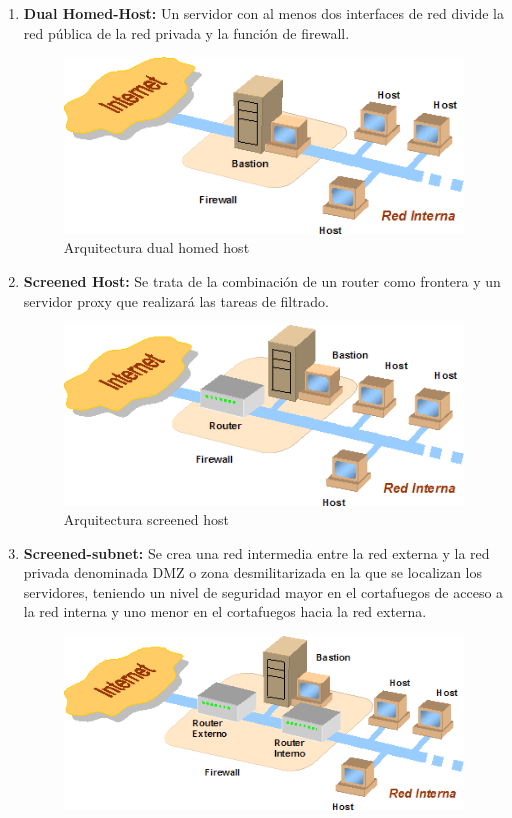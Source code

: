 \begin{enumerate}
\begin{enumerate}
\item {\bfseries Dual Homed-Host:}
Un servidor con al menos dos interfaces de red divide la red pública de la red privada y la función de firewall.
\begin{figure}[tphb]
  		   \centering
     		   \includegraphics[width=5in]{dual-homed-host.png}
  		   \caption{Arquitectura dual homed host \cite{firewall}}
  		   \label{img:dual-homed-host}
\end{figure}
\item {\bfseries Screened Host:}
Se trata de la combinación de un router como frontera y un servidor proxy que realizará las tareas de filtrado.
\begin{figure}[tphb]
  		   \centering
     		   \includegraphics[width=5in]{screened-host.png}
  		   \caption{Arquitectura screened host \cite{firewall}}
  		   \label{img:screened-host}
\end{figure}
\item {\bfseries Screened-subnet:}
Se crea una red intermedia entre la red externa y la red privada denominada DMZ o zona desmilitarizada en la que se localizan los servidores, teniendo un nivel de seguridad mayor en el cortafuegos de acceso a la red interna y uno menor en el cortafuegos hacia la red externa.
\begin{figure}[tphb]
  		   \centering
     		   \includegraphics[width=5in]{screened-subnet.png}

\end{figure}
\end{enumerate}
\end{enumerate}
